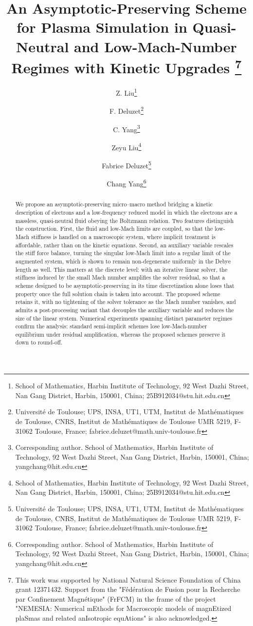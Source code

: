 \documentclass[pdflatex,final,10pt]{article}
\makeatletter
\newcommand{\IMT}{Universit\'e de Toulouse; UPS, INSA, UT1, UTM, Institut de Math\'ematiques de Toulouse,
CNRS, Institut de Math\'ematiques de Toulouse UMR 5219, F-31062 Toulouse, France; fabrice.deluzet@math.univ-toulouse.fr}
\newcommand{\HIT}{Corresponding author. School of Mathematics, Harbin Institute of Technology, 92 West Dazhi Street, Nan Gang District, Harbin, 150001, China;
yangchang@hit.edu.cn}
\newcommand{\HITlzy}{School of Mathematics, Harbin Institute of Technology, 92 West Dazhi Street, Nan Gang District, Harbin, 150001, China;
25B912034@stu.hit.edu.cn}
\newcommand{\Dollars}{This work was supported by National Natural Science Foundation of China 
grant 12371432.  Support from the "F\'ed\'eration de Fusion pour la 
Recherche par Confinement Magn\'etique" (FrFCM) in the frame of the 
project "NEMESIA: Numerical mEthods for Macroscopic models of 
magnEtized plaSmas and related anIsotropic equAtions" is also acknowledged.
  }
\makeatother
\begin{document}
\title{An Asymptotic-Preserving Scheme for Plasma Simulation
    in Quasi-Neutral and Low-Mach-Number Regimes with Kinetic Upgrades
\footnote{\Dollars}}
\author{Z. Liu\thanks{\HITlzy} \and F. Deluzet\thanks{\IMT}
\and C. Yang\thanks{\HIT}}
\newtheorem{assumption}{Assumption}


\author{Zeyu Liu\thanks{\HITlzy} \and Fabrice Deluzet\thanks{\IMT} \and Chang Yang\thanks{\HIT}}


\maketitle



\begin{abstract}
 We propose an asymptotic-preserving micro--macro method bridging a kinetic description of electrons and a low-frequency reduced model in which the electrons are a massless, quasi-neutral fluid obeying the Boltzmann relation. Two features distinguish the construction. First, the fluid and low-Mach limits are coupled, so that the low-Mach stiffness is handled on a macroscopic system, where implicit treatment is affordable, rather than on the kinetic equations. Second, an auxiliary variable rescales the stiff force balance, turning the singular
low-Mach limit into a regular limit of the augmented system, which is shown to remain non-degenerate uniformly in the Debye length as well. This matters at the discrete level: with an iterative linear solver, the stiffness induced by the small Mach number amplifies the solver residual, so that a scheme designed to be asymptotic-preserving in its time discretization alone loses that property once the full solution chain is taken into account. The proposed scheme retains it, with no tightening of the solver tolerance as the Mach number vanishes, and admits a post-processing variant that decouples the auxiliary variable and reduces the size of the linear system. Numerical experiments spanning distinct parameter regimes confirm the analysis: standard semi-implicit schemes lose low-Mach-number equilibrium under residual amplification, whereas the proposed schemes preserve it down to round-off. 
\end{abstract}
\end{document}
